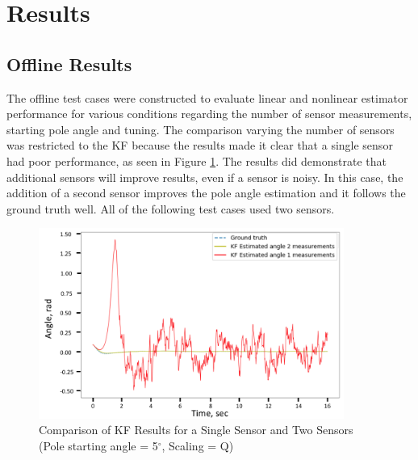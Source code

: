 \documentclass{article}
\begin{document}
\section{Results}
\subsection{Offline Results}

The offline test cases were constructed to evaluate linear and nonlinear estimator performance for various conditions regarding the number of sensor measurements, starting pole angle and tuning.  The comparison varying the number of sensors was restricted to the KF because the results made it clear that a single sensor had poor performance, as seen in Figure \ref{fig:sensorsKF}.  The results did demonstrate that additional sensors will improve results, even if a sensor is noisy.  In this case, the addition of a second sensor improves the pole angle estimation and it follows the ground truth well.  All of the following test cases used two sensors.
\begin{figure}[h!]
 	\centering
 	\includegraphics[width=10cm,keepaspectratio]{SensorsKF.png}
 	\caption{Comparison of KF Results for a Single Sensor and Two Sensors (Pole starting angle = 5$^{\circ}$, Scaling = Q)}
 	\label{fig:sensorsKF}
 \end{figure}
 
\end{document}
